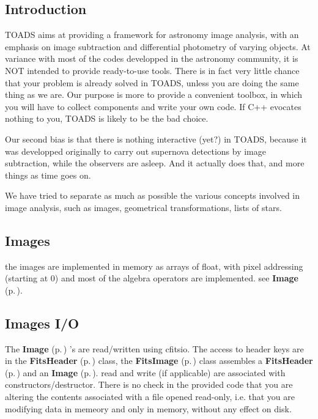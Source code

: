 \subsection{Introduction}\label{introduction}


TOADS aims at providing a framework for astronomy image analysis, with an emphasis on image subtraction and differential photometry of varying objects. At variance with most of the codes developped in the astronomy community, it is NOT intended to provide ready-to-use tools. There is in fact very little chance that your problem is already solved in TOADS, unless you are doing the same thing as we are. Our purpose is more to provide a convenient toolbox, in which you will have to collect components and write your own code. If C++ evocates nothing to you, TOADS is likely to be the bad choice.

Our second bias is that there is nothing interactive (yet?) in TOADS, because it was developped originally to carry out supernova detections by image subtraction, while the observers are asleep. And it actually does that, and more things as time goes on.

We have tried to separate as much as possible the various concepts involved in image analysis, such as images, geometrical transformations, lists of stars.

\subsection{Images}\label{images}
 the images are implemented in memory as arrays of float, with  pixel addressing (starting at 0) and most of the algebra  operators are implemented. see {\bf Image} {\rm (p.\,\pageref{class_image})}.

\subsection{Images I/O}\label{imageio}
 The {\bf Image} {\rm (p.\,\pageref{class_image})} 's are read/written using cfitsio. The access to header keys are in the {\bf Fits\-Header} {\rm (p.\,\pageref{class_fitsheader})} class, the {\bf Fits\-Image} {\rm (p.\,\pageref{class_fitsimage})} class assembles a {\bf Fits\-Header} {\rm (p.\,\pageref{class_fitsheader})} and an {\bf Image} {\rm (p.\,\pageref{class_image})}. read and write (if applicable) are associated with constructors/destructor. There is no check in the provided code  that you are altering the contents associated with a file opened read-only, i.e. that you are modifying data in memeory and only in memory, without any effect on disk.

